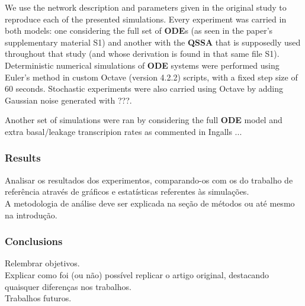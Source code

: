 We use the network description and parameters given in the original study to reproduce each of the presented simulations.
Every experiment was carried in both models: one considering the full set of \textbf{ODE}s (as seen in the paper's supplementary material S1) and another with the \textbf{QSSA} that is supposedly used throughout that study (and whose derivation is found in that same file S1).
Deterministic numerical simulations of \textbf{ODE} systems were performed using Euler's method in custom Octave (version 4.2.2) scripts, with a fixed step size of 60 seconds.
Stochastic experiments were also carried using Octave by adding Gaussian noise generated with ???.


Another set of simulations were ran by considering the full \textbf{ODE} model and extra basal/leakage transcripion rates as commented in Ingalls ...


\subsubsection{Results}

Analisar os resultados dos experimentos, comparando-os com os do trabalho de referência através de gráficos e estatísticas referentes às simulações.\\
A metodologia de análise deve ser explicada na seção de métodos ou até mesmo na introdução.\\


\subsubsection{Conclusions}

Relembrar objetivos.\\
Explicar como foi (ou não) possível replicar o artigo original, destacando quaisquer diferenças nos trabalhos.\\
Trabalhos futuros.\\
